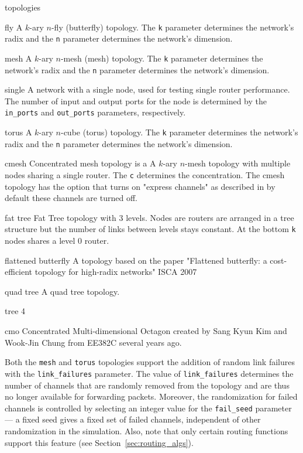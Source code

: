 \documentclass[11pt]{article}
\begin{document}
\begin{opt_list}{topologies}
\item[fly] A $k$-ary $n$-fly (butterfly) topology. The \texttt{k}
parameter determines the network's radix and the \texttt{n} parameter
determines the network's dimension.

\item[mesh] A $k$-ary $n$-mesh (mesh) topology. The \texttt{k}
parameter determines the network's radix and the \texttt{n} parameter determines
the network's dimension.

\item[single] A network with a single node, used for testing single
router performance.  The number of input and output ports for the node
is determined by the \texttt{in\_ports} and \texttt{out\_ports} parameters,
respectively.

\item[torus] A $k$-ary $n$-cube (torus) topology.  The \texttt{k}
parameter determines the network's radix and the \texttt{n} parameter determines
the network's dimension.
\item[cmesh] Concentrated mesh topology is a A $k$-ary $n$-mesh topology with multiple nodes sharing a single router. The \texttt{c} determines the concentration. The cmesh topology has the option that turns on "express channels" as described in  by default these channels are turned off. 

\item[fat tree] Fat Tree topology with 3 levels. Nodes are routers are arranged in a tree structure but the number of links between levels stays constant. At the bottom \texttt{k} nodes shares a level 0 router.

\item[flattened butterfly] A topology based on the paper "Flattened butterfly: a cost-efficient topology for high-radix networks" ISCA 2007

\item[quad tree] A quad tree topology.

\item[tree 4]

\item[cmo] Concentrated Multi-dimensional Octagon created by Sang Kyun Kim and Wook-Jin Chung from  EE382C several years ago.

\end{opt_list}

Both the \texttt{mesh} and \texttt{torus} topologies support the
addition of random link failures with the \texttt{link\_failures}
parameter.  The value of \texttt{link\_failures} determines the number
of channels that are randomly removed from the topology and are thus
no longer available for forwarding packets.  Moreover, the
randomization for failed channels is controlled by selecting an
integer value for the \texttt{fail\_seed} parameter --- a fixed seed
gives a fixed set of failed channels, independent of other
randomization in the simulation.  Also, note that only certain routing
functions support this feature (see Section~\ref{sec:routing_algs}).
\end{document}
